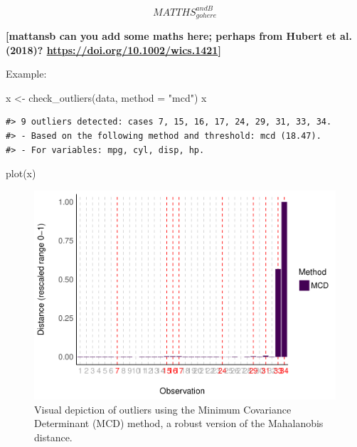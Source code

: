 \documentclass[
]{article}
\newenvironment{Shaded}{\begin{snugshade}}{\end{snugshade}}
\newcommand{\AttributeTok}[1]{\textcolor[rgb]{0.77,0.63,0.00}{#1}}
\newcommand{\FunctionTok}[1]{\textcolor[rgb]{0.00,0.00,0.00}{#1}}
\newcommand{\NormalTok}[1]{#1}
\newcommand{\OtherTok}[1]{\textcolor[rgb]{0.56,0.35,0.01}{#1}}
\newcommand{\StringTok}[1]{\textcolor[rgb]{0.31,0.60,0.02}{#1}}
\begin{document}
\[
MATTHS_{gohere}^{andB}
\]

\textbf{{[}mattansb can you add some maths here; perhaps from Hubert et al. (2018)? \url{https://doi.org/10.1002/wics.1421}{]}}

Example:



\begin{Shaded}
\begin{Highlighting}[]
\NormalTok{x }\OtherTok{\textless{}{-}} \FunctionTok{check\_outliers}\NormalTok{(data, }\AttributeTok{method =} \StringTok{"mcd"}\NormalTok{)}
\NormalTok{x}
\end{Highlighting}
\end{Shaded}

\begin{verbatim}
#> 9 outliers detected: cases 7, 15, 16, 17, 24, 29, 31, 33, 34.
#> - Based on the following method and threshold: mcd (18.47).
#> - For variables: mpg, cyl, disp, hp.
\end{verbatim}

\begin{Shaded}
\begin{Highlighting}[]
\FunctionTok{plot}\NormalTok{(x)}
\end{Highlighting}
\end{Shaded}

\begin{figure}
\includegraphics[width=1\linewidth]{paper_files/figure-latex/multivariate-1} \caption{Visual depiction of outliers using the Minimum Covariance Determinant (MCD) method, a robust version of the Mahalanobis distance.}\label{fig:multivariate}
\end{figure}
\end{document}
